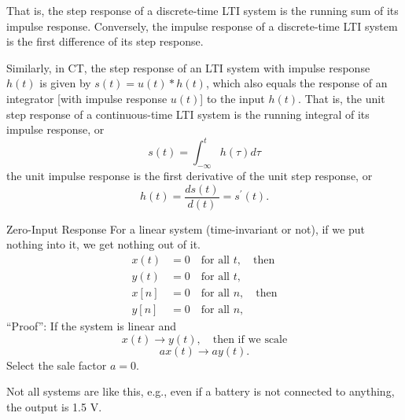 \begin{frame}{}
    That is, the step response of a discrete-time LTI system is the running sum of its impulse response. Conversely, the impulse response of a discrete-time LTI system is the first difference of its step response.\par
    \vspace{0.1cm}
    Similarly, in CT, the step response of an LTI system with impulse response $h(t)$ is given by $s(t) = u(t) \ast h(t)$, which also equals the response of an integrator
    [with impulse response $u(t)$] to the input $h(t)$. That is, the unit step response of a continuous-time LTI system is the running integral of its impulse response, or
    {
        \begin{equation*}
            s(t) = \int_{-\infty}^{t}h(\tau)d\tau
        \end{equation*}
    the unit impulse response is the first derivative of the unit step response, or
        \begin{equation*}
            h(t) = \frac{ds(t)}{d(t)} = s^\prime(t).
        \end{equation*}
    }
\end{frame}




\begin{frame}{Zero-Input Response}
    For a linear system (time-invariant or not), if we put nothing into it, we get nothing out of it.
    \begin{align*}
        x(t)  &= 0 \quad \text{for all } t, \quad \text{then}\\
        y(t)  &= 0 \quad \text{for all } t,\\
        x[n]  &= 0 \quad \text{for all } n, \quad \text{then}\\
        y[n]  &= 0 \quad \text{for all } n,
    \end{align*}
    ``Proof'': If the system is linear and
    \begin{equation*}
        x(t) \rightarrow y(t), \quad \text{then if we scale}
    \end{equation*} \pause
    \begin{equation*}
        ax(t) \rightarrow ay(t).
    \end{equation*}
    Select the sale factor $a=0$.\par
    Not all systems are like this, e.g., even if a battery is not connected to anything, the output is 1.5 V.
\end{frame}

